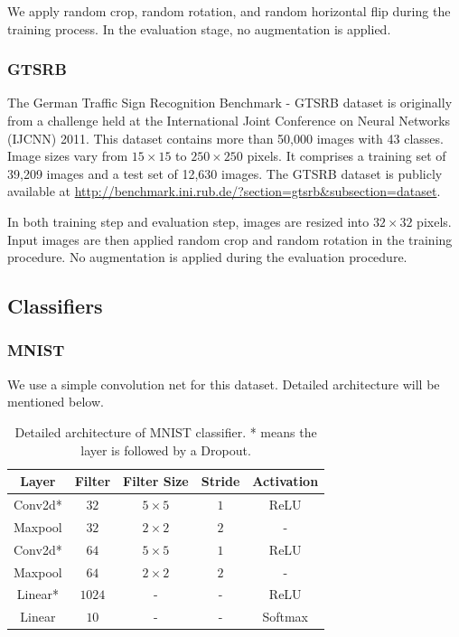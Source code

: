 We apply random crop, random rotation, and random horizontal flip during the training process. In the evaluation stage, no augmentation is applied. 
\subsubsection{GTSRB}
The German Traffic Sign Recognition Benchmark - GTSRB \cite{stallkamp2012man} dataset is originally from a challenge held at the International Joint Conference on Neural Networks (IJCNN) 2011. This dataset contains more than 50,000 images with 43 classes. Image sizes vary from $15 \times 15$ to $250 \times 250$ pixels. It comprises a training set of 39,209 images and a test set of 12,630 images. The GTSRB dataset is publicly available at \url{http://benchmark.ini.rub.de/?section=gtsrb&subsection=dataset}.

In both training step and evaluation step, images are resized into $32 \times 32$ pixels. Input images are then applied random crop and random rotation in the training procedure. No augmentation is applied during the evaluation procedure. 

\subsection{Classifiers}
\subsubsection{MNIST}
We use a simple convolution net for this dataset. Detailed architecture will be mentioned below. 
\begin{table}[t]
\caption{Detailed architecture of MNIST classifier. * means the layer is followed by a Dropout.}
\label{tab: mnist classifier architecture}
\centering
    \begin{tabu} to \textwidth {ccccc}
    \toprule
    Layer & Filter & Filter Size & Stride & Activation \\
    \midrule
    Conv2d* & $32$ & $5 \times 5$ & $1$ & ReLU \\
    Maxpool & $32$ & $2 \times 2$ & $2$ & - \\
    Conv2d* & $64$ & $5 \times 5$ & $1$ & ReLU \\
    Maxpool & $64$ & $2 \times 2$ & $2$ & - \\
    Linear*  & $1024$ & - & - & ReLU \\
    Linear & $10$ & - & - & Softmax \\
    \bottomrule
    \end{tabu}
\end{table}

